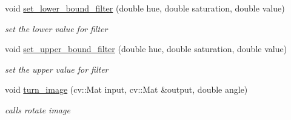\begin{DoxyCompactItemize}
void \mbox{\hyperlink{class_character___recognition___algorithm_a06c2a31ba8f4ab6e3aacea6b643a4d7d}{set\+\_\+lower\+\_\+bound\+\_\+filter}} (double hue, double saturation, double value)
\begin{DoxyCompactList}\small\item\em set the lower value for filter \end{DoxyCompactList}\item 
\mbox{\label{class_character___recognition___algorithm_a2add4eeeb34fb3a8bd35a1d5da0950a0}} 
void \mbox{\hyperlink{class_character___recognition___algorithm_a2add4eeeb34fb3a8bd35a1d5da0950a0}{set\+\_\+upper\+\_\+bound\+\_\+filter}} (double hue, double saturation, double value)
\begin{DoxyCompactList}\small\item\em set the upper value for filter \end{DoxyCompactList}\item 
\mbox{\label{class_character___recognition___algorithm_aeff8a2e07ed905b20d0150b977acd752}} 
void \mbox{\hyperlink{class_character___recognition___algorithm_aeff8a2e07ed905b20d0150b977acd752}{turn\+\_\+image}} (cv\+::\+Mat input, cv\+::\+Mat \&output, double angle)
\begin{DoxyCompactList}\small\item\em calls rotate image \end{DoxyCompactList}\end{DoxyCompactItemize}
